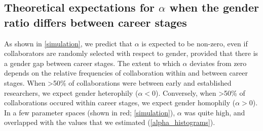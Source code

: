 \documentclass[12pt,]{article}
\begin{document}
\subsection{\texorpdfstring{Theoretical expectations for \(\alpha\) when
the gender ratio differs between career
stages}{Theoretical expectations for \textbackslash{}alpha when the gender ratio differs between career stages}}\label{theoretical-expectations-for-alpha-when-the-gender-ratio-differs-between-career-stages}

As shown in \autoref{simulation}, we predict that \(\alpha\) is expected
to be non-zero, even if collaborators are randomly selected with respect
to gender, provided that there is a gender gap between career stages.
The extent to which \(\alpha\) deviates from zero depends on the
relative frequencies of collaboration within and between career stages.
When \textgreater{}50\% of collaborations were between early and
established researchers, we expect gender heterophily (\(\alpha < 0\)).
Conversely, when \textgreater{}50\% of collaborations occured within
career stages, we expect gender homophily (\(\alpha > 0\)). In a few
parameter spaces (shown in red; \autoref{simulation}), \(\alpha\) was
quite high, and overlapped with the values that we estimated
(\autoref{alpha_histograms}).
\end{document}
